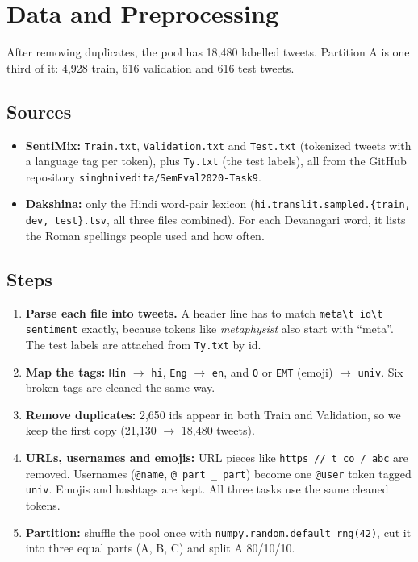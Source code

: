 \section{Data and Preprocessing}

After removing duplicates, the pool has 18,480 labelled tweets. Partition A is one third of it: 4,928 train, 616 validation and 616 test tweets.

\subsection*{Sources}
\begin{itemize}
    \item \textbf{SentiMix:} \texttt{Train.txt}, \texttt{Validation.txt} and \texttt{Test.txt} (tokenized tweets with a language tag per token), plus \texttt{Ty.txt} (the test labels), all from the GitHub repository \texttt{singhnivedita/SemEval2020-Task9}.
    \item \textbf{Dakshina:} only the Hindi word-pair lexicon (\texttt{hi.translit.sampled.\{train, dev, test\}.tsv}, all three files combined). For each Devanagari word, it lists the Roman spellings people used and how often.
\end{itemize}

\subsection*{Steps}
\begin{enumerate}
    \item \textbf{Parse each file into tweets.} A header line has to match \texttt{meta\textbackslash t id\textbackslash t sentiment} exactly, because tokens like \textit{metaphysist} also start with ``meta''. The test labels are attached from \texttt{Ty.txt} by id.
    \item \textbf{Map the tags:} \texttt{Hin} $\rightarrow$ \texttt{hi}, \texttt{Eng} $\rightarrow$ \texttt{en}, and \texttt{O} or \texttt{EMT} (emoji) $\rightarrow$ \texttt{univ}. Six broken tags are cleaned the same way.
    \item \textbf{Remove duplicates:} 2,650 ids appear in both Train and Validation, so we keep the first copy (21,130 $\rightarrow$ 18,480 tweets).
    \item \textbf{URLs, usernames and emojis:} URL pieces like \texttt{https // t co / abc} are removed. Usernames (\texttt{@name}, \texttt{@ part \_ part}) become one \texttt{@user} token tagged \texttt{univ}. Emojis and hashtags are kept. All three tasks use the same cleaned tokens.
    \item \textbf{Partition:} shuffle the pool once with \texttt{numpy.random.default\_rng(42)}, cut it into three equal parts (A, B, C) and split A 80/10/10.
\end{enumerate}

